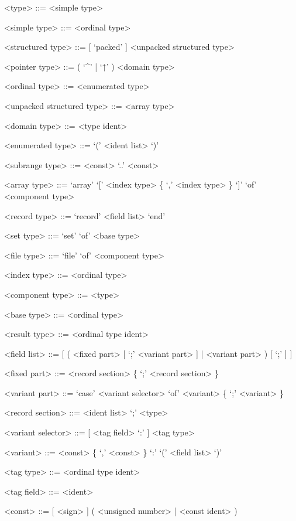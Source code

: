 \documentclass{article}
\begin{document}
{
  \begin{grammar}
    <type> ::= <simple type>  

    <simple type> ::= <ordinal type> 

    <structured type> ::= [ `packed' ] <unpacked structured type> 

    <pointer type> ::= ( `^' | `↑' ) <domain type> 

    <ordinal type> ::= <enumerated type>  

    <unpacked structured type> ::= <array type>   

    <domain type> ::= <type ident>

    <enumerated type> ::= `(' <ident list> `)'

    <subrange type> ::= <const> `..' <const>

    <array type> ::= `array' `[' <index type> \{ `,' <index type> \} `]' `of' <component type>

    <record type> ::= `record' <field list> `end'

    <set type> ::= `set' `of' <base type>

    <file type> ::= `file' `of' <component type>

    <index type> ::= <ordinal type>

    <component type> ::= <type>

    <base type> ::= <ordinal type>

    <result type> ::= <ordinal type ident>  

    <field list> ::= [ ( <fixed part> [ `;' <variant part> ] | <variant part> ) [ `;' ] ]

    <fixed part> ::= <record section> \{ `;' <record section> \}

    <variant part> ::= `case' <variant selector> `of' <variant> \{ `;' <variant> \}

    <record section> ::= <ident list> `;' <type>

    <variant selector> ::= [ <tag field> `:' ] <tag type>

    <variant> ::= <const> \{ `,' <const> \} `:' `(' <field list> `)'

    <tag type> ::= <ordinal type ident>

    <tag field> ::= <ident>

    <const> ::= [ <sign> ] ( <unsigned number> | <const ident> )
  \end{grammar}
}
\end{document}
